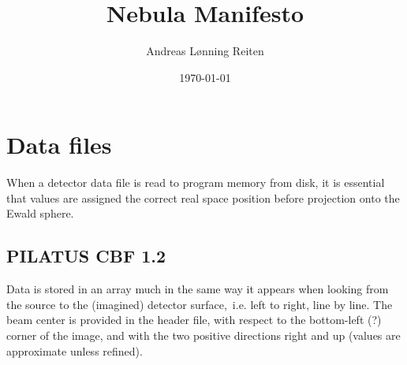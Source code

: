 \documentclass[11pt]{article}
\title{\textbf{Nebula Manifesto}}
\author{Andreas Lønning Reiten}
\date{\today}
\begin{document}
\maketitle

\section{Data files}
When a detector data file is read to program memory from disk, it is essential that values are assigned the correct real space position before projection onto the Ewald sphere.
\subsection{PILATUS CBF 1.2}
Data is stored in an array much in the same way it appears when looking from the source to the (imagined) detector surface,~i.e. left to right, line by line. The beam center is provided in the header file, with respect to the bottom-left (?) corner of the image, and with the two positive directions right and up (values are approximate unless refined).
\end{document}
